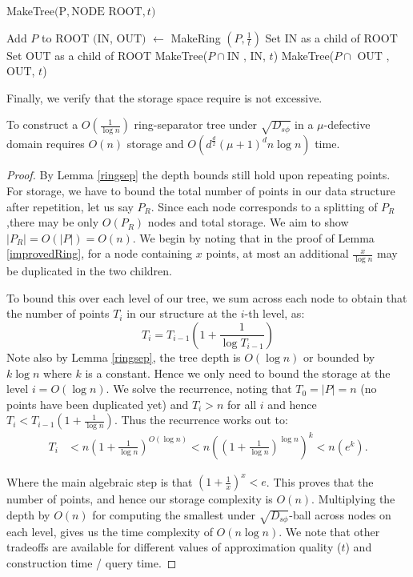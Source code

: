 \documentclass[11pt]{myclass}
\newcommand{\sbreg}{\ensuremath{D_{s\phi}}}
\begin{document}
\begin{algorithm}
  \caption{MakeTree$($P$, \text{NODE ROOT}, t)$}
  \begin{algorithmic}
  \STATE {}
  	\STATE Add $P$ to $\text{ROOT}$
    \STATE $(\text{IN}$, $\text{OUT})$ $\gets$ MakeRing $\left(P, \frac{1}{t} \right)$
	\STATE Set $\text{IN}$ as a child of $\text{ROOT}$
	\STATE Set $\text{OUT}$ as a child of $\text{ROOT}$
	\STATE MakeTree($P \cap \text{IN}$ , $\text{IN}$, $t$)
	\STATE MakeTree($P \cap \text{ OUT}$ , $\text{OUT}$, $t$)
  \end{algorithmic}
  \label{makeTree}
\end{algorithm}


Finally, we verify that the storage space require is not excessive.
\begin{lemma}\label{ringstorage}
To construct a $O(\frac{1}{\log n})$ ring-separator tree under $\sqrt{\sbreg}$ in a $\mu$-defective domain requires $O(n)$ storage and $O(d^{\frac{d}{2}} (\mu+1)^d n \log n)$ time.
\end{lemma}

\begin{proof}
By Lemma \ref{ringsep} the depth bounds still hold upon repeating points.  For storage, we have to bound
the total number of points in our data structure after repetition, let us say $P_R$. 
Since each node corresponds to a splitting of $P_R$,there may be only $O(P_R)$ nodes and total storage. We aim to show $|P_R| = O(|P|) = O(n)$. We begin by noting that in the proof of Lemma \ref{improvedRing}, for a node containing $x$ points, at most an additional $\frac{x}{\log n}$ may be duplicated in the two children.

To bound this over each level of our tree, we sum across each node to obtain that the number of points $T_i$ in our structure at the $i$-th level, as: 
\begin{equation}
T_i = T_{i-1} \left( 1 + \frac{1}{\log T_{i-1}} \right)
\end{equation} 
Note also by Lemma \ref{ringsep}, the tree depth is $O(\log n)$ 
or bounded by $k \log n$ where $k$ is a constant. Hence we only need to bound the storage at the level $i = O(\log n)$. We solve the recurrence, noting that $T_0 = |P| = n$ (no points have been duplicated yet) and $T_i > n$ for all $i$ and hence 
$T_i < T_{i-1}(1 + \frac{1}{\log n})$. Thus the recurrence works out to:
\begin{align*}
T_i &< n \left( 1+ \frac{1}{\log n} \right)^{O(\log n)} 
< n \left( \left( 1+ \frac{1}{\log n} \right)^{\log n} \right)^k 
< n(e^k).
\end{align*}

Where the main algebraic step is that $(1+ \frac{1}{x})^x < e$. 
This proves that the number of points, and hence our storage complexity is $O(n)$. Multiplying the depth by $O(n)$ for computing the smallest under $\sqrt{\sbreg}$-ball across nodes on each level, gives us the time complexity of $O(n \log n)$.
We note that other tradeoffs are available for different values of approximation quality ($t$) and construction time / query time.
\end{proof}
\end{document}
